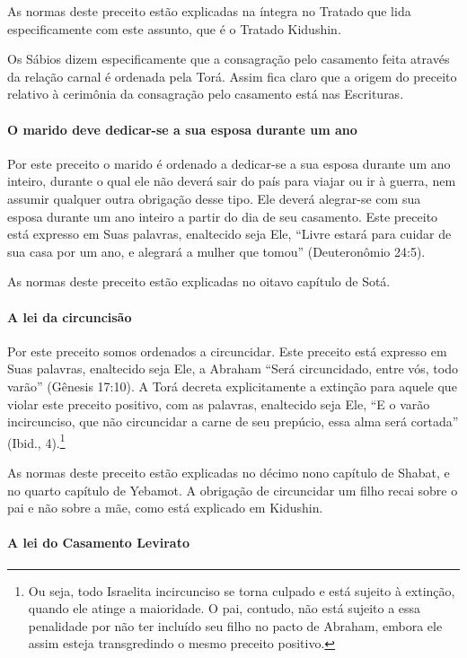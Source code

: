 As normas deste preceito estão explicadas na íntegra no Tratado que lida
especificamente com este assunto, que é o Tratado Kidushin.

Os Sábios dizem especificamente que a consagração pelo casamento feita
através da relação carnal é ordenada pela Torá. Assim fica claro que a
origem do preceito relativo à cerimônia da consagração pelo casamento está
nas Escrituras.

\paragraph{O marido deve dedicar-se a sua esposa durante um ano}

Por este preceito o marido é ordenado a dedicar-se a sua esposa durante
um ano inteiro, durante o qual ele não deverá sair do país para viajar
ou ir à guerra, nem assumir qualquer outra obrigação desse tipo. Ele
deverá alegrar-se com sua esposa durante um ano inteiro a partir do dia
de seu casamento. Este preceito está expresso em Suas palavras,
enaltecido seja Ele, ``Livre estará para cuidar de sua casa por um ano,
e alegrará a mulher que tomou'' (Deuteronômio 24:5).

As normas deste preceito estão explicadas no oitavo capítulo de Sotá.

\paragraph{A lei da circuncisão}

Por este preceito somos ordenados a circuncidar. Este preceito está
expresso em Suas palavras, enaltecido seja Ele, a Abraham ``Será
circuncidado, entre vós, todo varão'' (Gênesis 17:10). A Torá decreta
explicitamente a extinção para aquele que violar este preceito
positivo, com as palavras, enaltecido seja Ele, ``E o varão
incircunciso, que não circuncidar a carne de seu prepúcio, essa alma
será cortada'' (Ibid., 4).\footnote{Ou seja, todo Israelita incircunciso se torna culpado e está
sujeito à extinção, quando ele atinge a maioridade. O pai, contudo, não
está sujeito a essa penalidade por não ter incluído seu filho no pacto
de Abraham, embora ele assim esteja transgredindo o mesmo preceito
positivo.}

As normas deste preceito estão explicadas no décimo nono capítulo de
Shabat, e no quarto capítulo de Yebamot. A obrigação de circuncidar um
filho recai sobre o pai e não sobre a mãe, como está explicado em
Kidushin.

\paragraph{A lei do Casamento Levirato}

